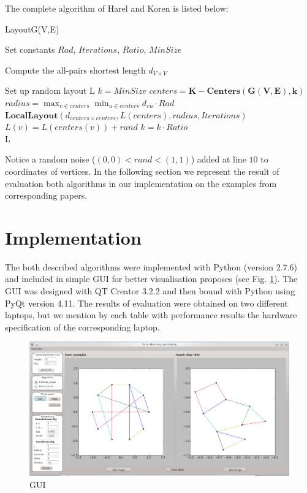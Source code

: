\documentclass[12pt,a4paper]{article}
\begin{document}
\FloatBarrier 

The complete algorithm of Harel and Koren is listed below:

\begin{algorithm}
\caption{LayoutG(V,E) \cite{DavidHarel2002}}
\label{HK}
\begin{algorithmic}[1]
\item Set constants $Rad$, $Iterations$, $Ratio$, $MinSize$
\item Compute the all-pairs shortest length $d_{V\times V}$
\item Set up random layout L
\State $ k = MinSize $
	\State $ centers =  \mathbf{K-Centers(G(V,E),k)} $
	\State $ radius =  \max_{v\in centers}\min_{u\in centers}d_{vu} \cdot Rad $	
	\State $\mathbf{LocalLayout}(d_{centers\times centers}, L(centers), radius, Iterations)$
		\State $L(v)=L(centers(v))+rand$
	\EndFor
	\State $k = k \cdot Ratio$
\EndWhile \\
\Return L
\end{algorithmic}
\end{algorithm}

Notice a random noise ($(0,0)<rand<(1,1)$) added at line $10$ to coordinates of vertices.
In the following section we represent the result of evaluation both algorithms in our implementation on the examples from corresponding papers.

\section{Implementation}
The both described algorithms were implemented with Python (version 2.7.6) and included in simple GUI for better visualisation proposes (see Fig. \ref{fig: interface}). The GUI was designed with QT Creator 3.2.2 and then bound with Python using PyQt version 4.11. The results of evaluation were obtained on two different laptops, but we mention by each table with performance results the hardware specification of the corresponding laptop.

\begin{figure}
	\centering
	\includegraphics[scale=0.4]{interface.png}
	\caption{GUI}\label{fig: interface}
\end{figure}
\end{document}
